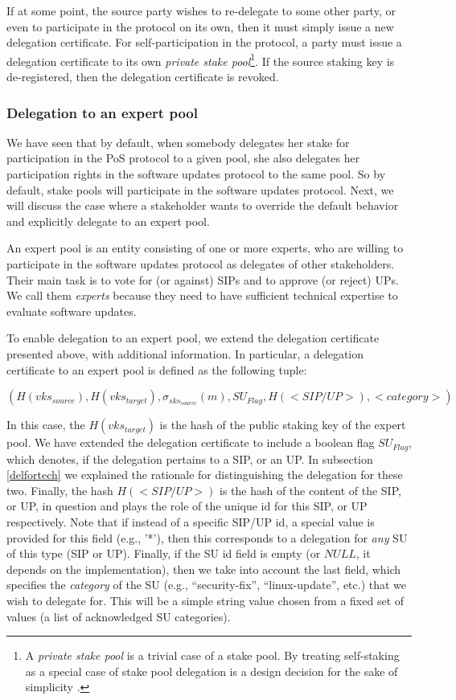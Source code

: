 \documentclass[11pt,a4paper]{article}
\begin{document}
If at some point, the source party wishes to re-delegate to some other party, or
even to participate in the protocol on its own, then it must simply issue a new
delegation certificate. For self-participation in the protocol, a party must
issue a delegation certificate to its own \emph{private stake pool}\footnote{A
  \emph{private stake pool} is a trivial case of a stake pool. By treating
  self-staking as a special case of stake pool delegation is a design decision
  for the sake of simplicity \cite{deldesign}.}. If the source staking key is
de-registered, then the delegation certificate is revoked.

\subsubsection{Delegation to an expert pool}
\label{sec:delegation-an-expert}

We have seen that by default, when somebody delegates her stake for
participation in the PoS protocol to a given pool, she also delegates her
participation rights in the software updates protocol to the same pool.
%
So by default, stake pools will participate in the software updates protocol.
Next, we will discuss the case where a stakeholder wants to override the default
behavior and explicitly delegate to an expert pool.

An expert pool is an entity consisting of one or more experts, who are willing
to participate in the software updates protocol as delegates of other
stakeholders. Their main task is to vote for (or against) SIPs and to approve
(or reject) UPs. We call them \emph{experts} because they need to have
sufficient technical expertise to evaluate software updates.

To enable delegation to an expert pool, we extend the delegation certificate
presented above, with additional information. In particular, a delegation
certificate to an expert pool is defined as the following tuple:

$$
(H(vks_{source}),
 H(vks_{target}),
 \sigma_{sks_{source}}(m),
 SU_{Flag},
 H(<SIP/UP>),
 <category>)
$$

In this case, the $H(vks_{target})$ is the hash of the public staking key of the
expert pool. We have extended the delegation certificate to include a boolean
flag $SU_{Flag}$, which denotes, if the delegation pertains to a SIP, or an UP.
In subsection \ref{delfortech} we explained the rationale
for distinguishing the delegation for these two. Finally, the hash $H(<SIP/UP>)$
is the hash of the content of the SIP, or UP, in question and plays the role of
the unique id for this SIP, or UP respectively. Note that if instead of a
specific SIP/UP id, a special value is provided for this field (e.g., '*'), then
this corresponds to a delegation for \emph{any} SU of this type (SIP or UP).
Finally, if the SU id field is empty (or $NULL$, it depends on the
implementation), then we take into account the last field, which specifies the
\emph{category} of the SU (e.g., ``security-fix'', ``linux-update'', etc.)
that we wish to delegate for. This will be a simple string value chosen from a
fixed set of values (a list of acknowledged SU categories).
\end{document}
